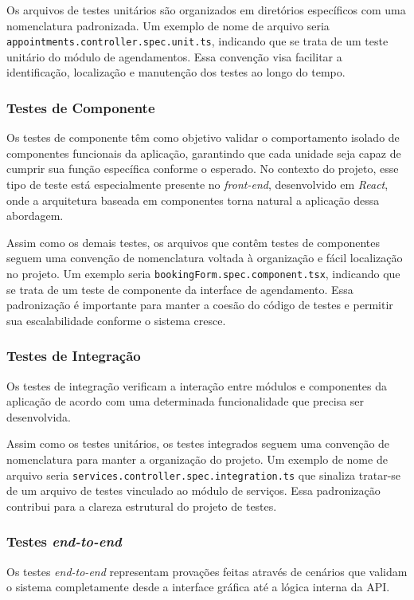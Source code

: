 Os arquivos de testes unitários são organizados em diretórios específicos com uma nomenclatura padronizada. Um exemplo de nome de arquivo seria \texttt{appointments.\allowbreak controller.\allowbreak spec.\allowbreak unit.ts}, indicando que se trata de um teste unitário do módulo de agendamentos. Essa convenção visa facilitar a identificação, localização e manutenção dos testes ao longo do tempo.

\subsubsection{Testes de Componente}
Os testes de componente têm como objetivo validar o comportamento isolado de componentes funcionais da aplicação, garantindo que cada unidade seja capaz de cumprir sua função específica conforme o esperado. No contexto do projeto, esse tipo de teste está especialmente presente no \textit{front-end}, desenvolvido em \textit{React}, onde a arquitetura baseada em componentes torna natural a aplicação dessa abordagem.

Assim como os demais testes, os arquivos que contêm testes de componentes seguem uma convenção de nomenclatura voltada à organização e fácil localização no projeto. Um exemplo seria \texttt{bookingForm.\allowbreak spec.\allowbreak component.\allowbreak tsx}, indicando que se trata de um teste de componente da interface de agendamento. Essa padronização é importante para manter a coesão do código de testes e permitir sua escalabilidade conforme o sistema cresce.

\subsubsection{Testes de Integração}
Os testes de integração verificam a interação entre módulos e componentes da aplicação de acordo com uma determinada funcionalidade que precisa ser desenvolvida.

Assim como os testes unitários, os testes integrados seguem uma convenção de nomenclatura para manter a organização do projeto. Um exemplo de nome de arquivo seria \texttt{services.\allowbreak controller.\allowbreak spec.\allowbreak integration.ts} que sinaliza tratar-se de um arquivo de testes vinculado ao módulo de serviços. Essa padronização contribui para a clareza estrutural do projeto de testes.


\subsubsection{Testes \textit{end-to-end}}
Os testes \textit{end-to-end} representam provações feitas através de cenários que validam o sistema completamente desde a interface gráfica até a lógica interna da API.

